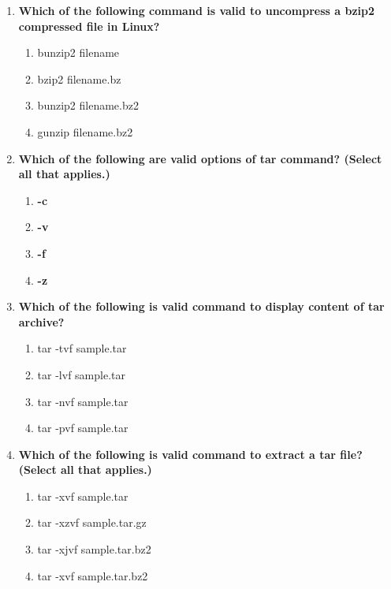 \begin{flushleft}
\begin{enumerate}
		
		\item \textbf{Which of the following command is valid to uncompress a bzip2 compressed file in Linux?}
		\begin{enumerate}[label=(\alph*)]
			\item bunzip2 filename       
			\item bzip2 filename.bz
			\item bunzip2 filename.bz2   %
			\item gunzip filename.bz2
		\end{enumerate}
		\bigskip
		\bigskip
		
		\item \textbf{Which of the following are valid options of tar command? (Select all that applies.)}
		\begin{enumerate}[label=(\alph*)]
			\item \textbf{-c}  %
			\item \textbf{-v}  %
			\item \textbf{-f}  %
			\item \textbf{-z}  %
		\end{enumerate}
		\bigskip
		\bigskip

		\item \textbf{Which of the following is valid command to display content of tar archive?}
		\begin{enumerate}[label=(\alph*)]
			\item tar -tvf sample.tar  %
			\item tar -lvf sample.tar
			\item tar -nvf sample.tar
			\item tar -pvf sample.tar
		\end{enumerate}
		\bigskip
		\bigskip
		
		
		\item \textbf{Which of the following is valid command to extract a tar file? (Select all that applies.)}
		\begin{enumerate}[label=(\alph*)]
			\item tar -xvf  sample.tar    %
			\item tar -xzvf sample.tar.gz  %
			\item tar -xjvf sample.tar.bz2   %
			\item tar -xvf  sample.tar.bz2
		\end{enumerate}
		\bigskip
		\bigskip
		
	\end{enumerate}
	
	
\end{flushleft}
